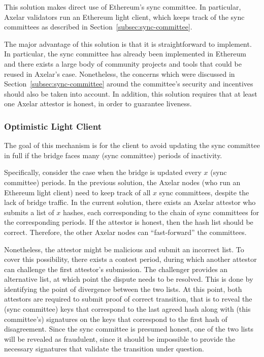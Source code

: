 This solution makes direct use of Ethereum's sync committee. In particular,
Axelar validators run an Ethereum light client, which keeps track of the sync
committees as described in Section~\ref{subsec:sync-committee}.

The major advantage of this solution is that it is straightforward to
implement. In particular, the sync committee has already been implemented in
Ethereum and there exists a large body of community projects and tools that
could be reused in Axelar's case. Nonetheless, the concerns which were
discussed in Section~\ref{subsec:sync-committee} around the committee's
security and incentives should also be taken into account. In addition, this
solution requires that at least one Axelar attestor is honest, in order to
guarantee liveness.

\subsubsection{Optimistic Light Client}

The goal of this mechanism is for the client to avoid updating the sync
committee in full if the bridge faces many (sync committee) periods of
inactivity.

Specifically, consider the case when the bridge is updated every $x$ (sync
committee) periods. In the previous solution, the Axelar nodes (who run an
Ethereum light client) need to keep track of all $x$ sync committees, despite
the lack of bridge traffic. In the current solution, there exists an Axelar
attestor who submits a list of $x$ hashes, each corresponding to the chain of
sync committees for the corresponding periods. If the attestor is honest, then
the hash list should be correct. Therefore, the other Axelar nodes can
``fast-forward'' the committees.

Nonetheless, the attestor might be malicious and submit an incorrect list. To
cover this possibility, there exists a contest period, during which another
attestor can challenge the first attestor's submission. The challenger provides
an alternative list, at which point the dispute needs to be resolved.  This is
done by identifying the point of divergence between the two lists. At this
point, both attestors are required to submit proof of correct transition, that
is to reveal the (sync committee) keys that correspond to the last agreed hash
along with (this committee's) signatures on the keys that correspond to the
first hash of disagreement. Since the sync committee is presumed honest, one of
the two lists will be revealed as fraudulent, since it should be impossible to
provide the necessary signatures that validate the transition under question.

